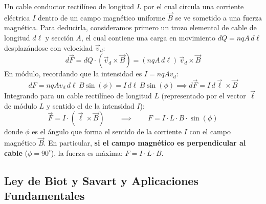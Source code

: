 \begin{ley}
Un cable conductor rectilíneo de longitud $L$ por el cual circula una corriente eléctrica $I$ dentro de un campo magnético uniforme $\vec{B}$ se ve sometido a una fuerza magnética. Para deducirla, consideramos primero un trozo elemental de cable de longitud $d\ell$ y sección $A$, el cual contiene una carga en movimiento $dQ = n q A\, d\ell$ desplazándose con velocidad $\vec{v}_d$:
\begin{equation}
    d\vec{F} = dQ \cdot (\vec{v}_d \times \vec{B}) = (n q A\, d\ell)\, \vec{v}_d \times \vec{B}
\end{equation}
En módulo, recordando que la intensidad es $I = n q A v_d$:
\begin{equation}
    dF = n q A v_d\, d\ell\, B \sin(\phi) = I\, d\ell\, B \sin(\phi) \implies d\vec{F} = I\, d\vec{\ell} \times \vec{B}
\end{equation}
Integrando para un cable rectilíneo de longitud $L$ (representado por el vector $\vec{\ell}$ de módulo $L$ y sentido el de la intensidad $I$):
\begin{equation}
    \boxed{\vec{F} = I \cdot (\vec{\ell} \times \vec{B}) \qquad \implies \qquad F = I \cdot L \cdot B \cdot \sin(\phi)}
\end{equation}
donde $\phi$ es el ángulo que forma el sentido de la corriente $I$ con el campo magnético $\vec{B}$. En particular, \textbf{si el campo magnético es perpendicular al cable} ($\phi = 90^\circ$), la fuerza es máxima: $F = I \cdot L \cdot B$.
\end{ley}

\subsection{Ley de Biot y Savart y Aplicaciones Fundamentales}

